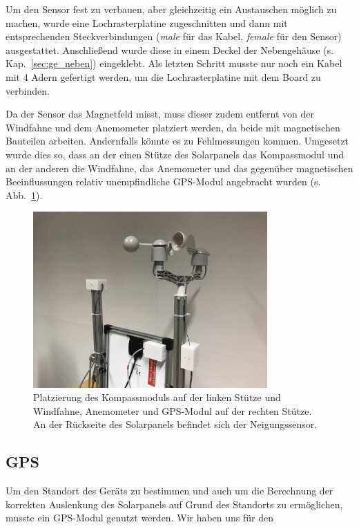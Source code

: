 Um den Sensor fest zu verbauen, aber gleichzeitig ein Austauschen möglich zu machen, wurde eine Lochrasterplatine zugeschnitten und dann mit entsprechenden Steckverbindungen (\textit{male} für das Kabel, \textit{female} für den Sensor) ausgestattet. Anschließend wurde diese in einem Deckel der Nebengehäuse (s. Kap.~\ref{sec:ge_neben}) eingeklebt. Als letzten Schritt musste nur noch ein Kabel mit 4 Adern gefertigt werden, um die Lochrasterplatine mit dem Board zu verbinden.

Da der Sensor das Magnetfeld misst, muss dieser zudem entfernt von der Windfahne und dem Anemometer platziert werden, da beide mit magnetischen Bauteilen arbeiten. Andernfalls könnte es zu Fehlmessungen kommen. Umgesetzt wurde dies so, dass an der einen Stütze des Solarpanels das Kompassmodul und an der anderen die Windfahne, das Anemometer und das gegenüber magnetischen Beeinflussungen relativ unempfindliche GPS-Modul angebracht wurden (s. Abb.~\ref{fig:Montage_Kompass_Wind}).

\begin{figure}[H]
 \centering
  \includegraphics[width=0.8\textwidth]{./img/Montage_Kompass_Wind.JPG}
  \caption{Platzierung des Kompassmoduls auf der linken Stütze und Windfahne, Anemometer und GPS-Modul auf der rechten Stütze. An der Rückseite des Solarpanels befindet sich der Neigungssensor.}\label{fig:Montage_Kompass_Wind}
\end{figure}

\subsection{GPS} %

Um den Standort des Geräts zu bestimmen und auch um die Berechnung der korrekten Auslenkung des Solarpanels auf Grund des Standorts zu ermöglichen, musste ein GPS-Modul genutzt werden. Wir haben uns für den %

